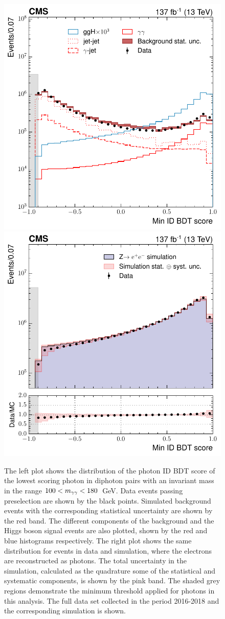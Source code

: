 \begin{figure}[hptb]
  \centering
  \includegraphics[width=.49\textwidth]{Figures/hgg_overview/DiphoBDT_minIDMVA_logPlot.pdf}
  \includegraphics[width=.49\textwidth]{Figures/hgg_overview/DYValidation_DiphoBDT_RatioPlot_minIDMVA_logPlot.pdf}
  \caption[Photon ID output score distributions]
  {
    The left plot shows the distribution of the photon ID BDT score of the lowest scoring photon in diphoton pairs with an invariant mass in the range $100<m_{\gamma\gamma}<180$~GeV. Data events passing preselection are shown by the black points. Simulated background events with the corresponding statistical uncertainty are shown by the red band. The different components of the background and the Higgs boson signal events are also plotted, shown by the red and blue histograms respectively. The right plot shows the same distribution for \Zee events in data and simulation, where the electrons are reconstructed as photons. The total uncertainty in the simulation, calculated as the quadrature some of the statistical and systematic components, is shown by the pink band. The shaded grey regions demonstrate the minimum threshold applied for photons in this analysis. The full data set collected in the period 2016-2018 and the corresponding simulation is shown.
  }
  \label{fig:photon_id_1}
\end{figure}


